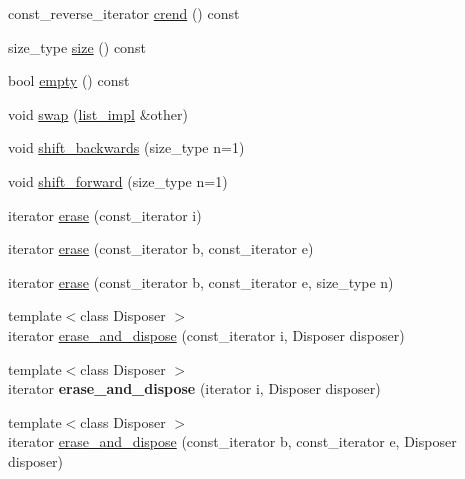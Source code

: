 \begin{DoxyCompactItemize}
\item 
const\+\_\+reverse\+\_\+iterator \hyperlink{classboost_1_1intrusive_1_1list__impl_a9b1515c25e9402cb27796dfeb8236baf}{crend} () const
\item 
size\+\_\+type \hyperlink{classboost_1_1intrusive_1_1list__impl_a9da0074a31566f3a7dbc3cd1a2d752c1}{size} () const
\item 
bool \hyperlink{classboost_1_1intrusive_1_1list__impl_afe2d286a6230f944fe3aa5a231d01e0a}{empty} () const
\item 
void \hyperlink{classboost_1_1intrusive_1_1list__impl_a08187766526ac474bc92fe5103fb8f7b}{swap} (\hyperlink{classboost_1_1intrusive_1_1list__impl}{list\+\_\+impl} \&other)
\item 
void \hyperlink{classboost_1_1intrusive_1_1list__impl_a7b0d4d3142d0243ea881a0be968bdb14}{shift\+\_\+backwards} (size\+\_\+type n=1)
\item 
void \hyperlink{classboost_1_1intrusive_1_1list__impl_ad8e0920e742cf90e983e0cc552b8489e}{shift\+\_\+forward} (size\+\_\+type n=1)
\item 
iterator \hyperlink{classboost_1_1intrusive_1_1list__impl_a5b8579de073832e53c545fe5cca65057}{erase} (const\+\_\+iterator i)
\item 
iterator \hyperlink{classboost_1_1intrusive_1_1list__impl_a267b1e44859c98eb3dbd9ad865910f61}{erase} (const\+\_\+iterator b, const\+\_\+iterator e)
\item 
iterator \hyperlink{classboost_1_1intrusive_1_1list__impl_a8811c0530715a891ecd912674b54eb6c}{erase} (const\+\_\+iterator b, const\+\_\+iterator e, size\+\_\+type n)
\item 
{\footnotesize template$<$class Disposer $>$ }\\iterator \hyperlink{classboost_1_1intrusive_1_1list__impl_a53330d72d48a69f95f337752b609f060}{erase\+\_\+and\+\_\+dispose} (const\+\_\+iterator i, Disposer disposer)
\item 
\mbox{\label{classboost_1_1intrusive_1_1list__impl_a3947df03a2116c6de2eb06148793164f}} 
{\footnotesize template$<$class Disposer $>$ }\\iterator {\bfseries erase\+\_\+and\+\_\+dispose} (iterator i, Disposer disposer)
\item 
{\footnotesize template$<$class Disposer $>$ }\\iterator \hyperlink{classboost_1_1intrusive_1_1list__impl_a9c68fe0a61da85e83ebe11bc02283bef}{erase\+\_\+and\+\_\+dispose} (const\+\_\+iterator b, const\+\_\+iterator e, Disposer disposer)

\end{DoxyCompactItemize}
